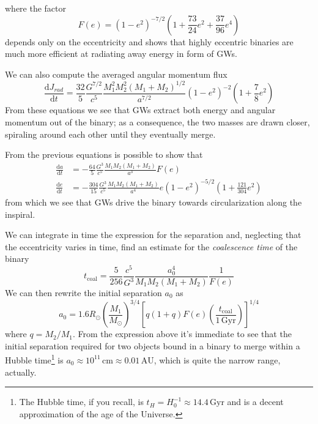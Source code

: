 where the factor 
\begin{equation*}
    F(e) = (1-e^{2})^{-7/2}\left(1+\frac{73}{24}e^{2}+\frac{37}{96}e^{4}\right)
\end{equation*}
depends only on the eccentricity and shows that highly eccentric binaries are much more eﬃcient at radiating away energy in form of GWs.
\par We can also compute the averaged angular momentum flux 
\begin{equation*}
    \frac{\text{d}J_{rad}}{\text{d}t} = \frac{32}{5}\frac{G^{7/2}}{c^{5}}\frac{M_{1}^{2}M_{2}^{2}(M_{1}+M_{2})^{1/2}}{a^{7/2}}(1-e^{2})^{-2}\left(1+\frac{7}{8}e^{2}\right)
\end{equation*}
From these equations we see that GWs extract both energy and angular momentum out of the binary; as a consequence, the two masses are drawn closer, spiraling around each other until they eventually merge.
\par From the previous equations is possible to show that 
\begin{align}
    \frac{\text{d}a}{\text{d}t} &= -\frac{64}{5}\frac{G^{3}}{c^{5}}\frac{M_{1}M_{2}(M_{1}+M_{2})}{a^{3}}F(e)\\
    \frac{\text{d}e}{\text{d}t} &= -\frac{304}{15}\frac{G^{3}}{c^{5}}\frac{M_{1}M_{2}(M_{1}+M_{2})}{a^{4}}e(1-e^{2})^{-5/2}\left(1+\frac{121}{304}e^{2}\right)
    \label{eq:orb_variation}
\end{align}
from which we see that GWs drive the binary towards circularization along the inspiral.
\par We can integrate in time the expression for the separation and, neglecting that the eccentricity varies in time, find an estimate for the \emph{coalescence time} of the binary 
\begin{equation}
    t_{\text{coal}} = \frac{5}{256}\frac{c^{5}}{G^{3}}\frac{a_{0}^{4}}{M_{1}M_{2}(M_{1}+M_{2})}\frac{1}{F(e)}
    \label{eq:coalescence_time}
\end{equation}
We can then rewrite the initial separation $a_{0}$ as 
\begin{equation*}
    a_{0} = 1.6R_{\odot}\left(\frac{M_{1}}{M_{\odot}}\right)^{3/4}\left[q(1+q)F(e)\left(\frac{t_{\text{coal}}}{1\,\text{Gyr}}\right)\right]^{1/4}
\end{equation*}
where $q = M_{2}/M_{1}$. From the expression above it's immediate to see that the initial separation required for two objects bound in a binary to merge within a Hubble time\footnote{The Hubble time, if you recall, is $t_{H} = H_{0}^{-1}\approx 14.4\,\text{Gyr}$ and is a decent approximation of the age of the Universe.} is $a_{0}\approx 10^{11}\,\text{cm}\approx 0.01\,\text{AU}$, which is quite the narrow range, actually.
